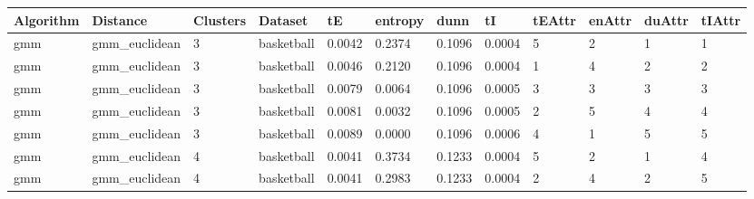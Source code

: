\documentclass[
]{article}
\begin{document}
\begin{longtable}{| p{1.1cm} | p{2cm} | p{0.8cm} | p{1.3cm} | p{0.60cm} | p{0.7cm} | p{0.65cm} | p{0.65cm} | p{0.65cm} | p{0.65cm} | p{0.7cm} | p{0.65cm} |}
\hline
\scriptsize  Algorithm & \scriptsize  Distance  &  \scriptsize Clusters & \scriptsize  Dataset & \scriptsize tE  & \scriptsize entropy & \scriptsize  dunn  & \scriptsize tI & \scriptsize tEAttr  & \scriptsize enAttr & \scriptsize duAttr & \scriptsize tIAttr \\
\hline
\scriptsize     gmm   & \scriptsize   gmm\_euclidean & \scriptsize    3    & \scriptsize basketball & \scriptsize    0.0042  &  \scriptsize 0.2374  & \scriptsize 0.1096 & \scriptsize    0.0004  &  \scriptsize    5  & \scriptsize    2  & \scriptsize    1  & \scriptsize    1 \\
\scriptsize     gmm   & \scriptsize   gmm\_euclidean  & \scriptsize    3   &  \scriptsize basketball  & \scriptsize    0.0046  &  \scriptsize 0.2120  & \scriptsize 0.1096 & \scriptsize    0.0004 &   \scriptsize    1  & \scriptsize    4 &  \scriptsize    2 &  \scriptsize    2 \\
\scriptsize     gmm   & \scriptsize   gmm\_euclidean & \scriptsize    3   &  \scriptsize basketball & \scriptsize    0.0079  &  \scriptsize 0.0064  &\scriptsize 0.1096 & \scriptsize    0.0005 &   \scriptsize    3  &  \scriptsize    3  &  \scriptsize    3  & \scriptsize    3 \\
\scriptsize     gmm   & \scriptsize   gmm\_euclidean & \scriptsize    3 &  \scriptsize basketball & \scriptsize    0.0081  &  \scriptsize 0.0032  & \scriptsize 0.1096 & \scriptsize    0.0005 &   \scriptsize    2  & \scriptsize    5  & \scriptsize    4  & \scriptsize    4 \\
\scriptsize     gmm   & \scriptsize   gmm\_euclidean & \scriptsize    3     & \scriptsize basketball & \scriptsize    0.0089  &  \scriptsize 0.0000 &  \scriptsize 0.1096 & \scriptsize    0.0006 &   \scriptsize    4  & \scriptsize    1  & \scriptsize    5  & \scriptsize    5 \\
\cline{3-12}
\scriptsize     gmm   & \scriptsize   gmm\_euclidean & \scriptsize    4     & \scriptsize basketball  & \scriptsize    0.0041  & \scriptsize 0.3734 &  \scriptsize 0.1233 & \scriptsize    0.0004 &   \scriptsize    5 & \scriptsize    2  & \scriptsize    1  & \scriptsize    4 \\
\scriptsize     gmm   & \scriptsize   gmm\_euclidean & \scriptsize    4     & \scriptsize basketball & \scriptsize    0.0041 &   \scriptsize 0.2983 & \scriptsize 0.1233 & \scriptsize    0.0004 &   \scriptsize    2 & \scriptsize    4 &  \scriptsize    2 &  \scriptsize    5 \\

\end{longtable}
\end{document}
